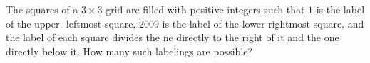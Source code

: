 The squares of a $3\times3$ grid are filled with positive integers such that $1$ is the label of the upper- leftmost square, $2009$ is the label of the lower-rightmost square, and the label of each square divides the  ne directly to the right of it and the one directly below it. How many such labelings are possible?